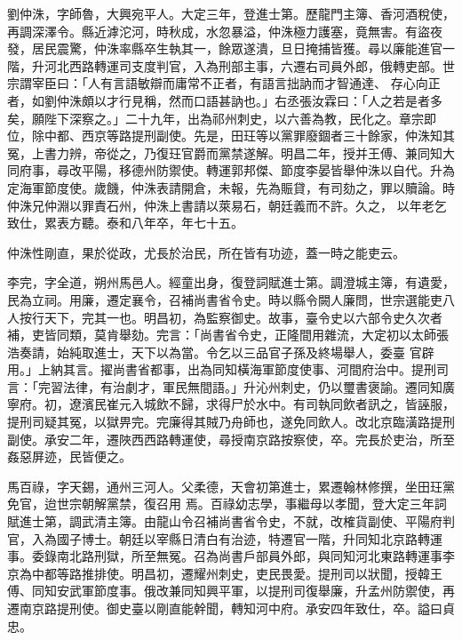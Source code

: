 \begin{pinyinscope}
 劉仲洙，字師魯，大興宛平人。大定三年，登進士第。歷龍門主簿、香河酒稅使，再調深澤令。縣近滹沱河，時秋成，水忽暴溢，仲洙極力護塞，竟無害。有盜夜發，居民震驚，仲洙率縣卒生執其一，餘眾遂潰，旦日掩捕皆獲。尋以廉能進官一階，升河北西路轉運司支度判官，入為刑部主事，六遷右司員外郎，俄轉吏部。世宗謂宰臣曰：「人有言語敏辯而庸常不正者，有語言拙訥而才智通達、
 存心向正者，如劉仲洙頗以才行見稱，然而口語甚訥也。」右丞張汝霖曰：「人之若是者多矣，願陛下深察之。」二十九年，出為祁州刺史，以六善為教，民化之。章宗即位，除中都、西京等路提刑副使。先是，田玨等以黨罪廢錮者三十餘家，仲洙知其冤，上書力辨，帝從之，乃復玨官爵而黨禁遂解。明昌二年，授并王傅、兼同知大同府事，尋改平陽，移德州防禦使。轉運郭邦傑、節度李晏皆舉仲洙以自代。升為定海軍節度使。歲饑，仲洙表請開倉，未報，先為賑貸，有司劾之，罪以贖論。時仲洙兄仲淵以罪責石州，仲洙上書請以萊易石，朝廷義而不許。久之，
 以年老乞致仕，累表方聽。泰和八年卒，年七十五。



 仲洙性剛直，果於從政，尤長於治民，所在皆有功迹，蓋一時之能吏云。



 李完，字全道，朔州馬邑人。經童出身，復登詞賦進士第。調澄城主簿，有遺愛，民為立祠。用廉，遷定襄令，召補尚書省令史。時以縣令闕人廉問，世宗選能吏八人按行天下，完其一也。明昌初，為監察御史。故事，臺令史以六部令史久次者補，吏皆同類，莫肯舉劾。完言：「尚書省令史，正隆間用雜流，大定初以太師張浩奏請，始純取進士，天下以為當。令乞以三品官子孫及終場舉人，委臺
 官辟用。」上納其言。擢尚書省都事，出為同知橫海軍節度使事、河間府治中。提刑司言：「完習法律，有治劇才，軍民無間語。」升沁州刺史，仍以璽書褒諭。遷同知廣寧府。初，遼濱民崔元入城飲不歸，求得尸於水中。有司執同飲者訊之，皆誣服，提刑司疑其冤，以獄畀完。完廉得其賊乃舟師也，遂免同飲人。改北京臨潢路提刑副使。承安二年，遷陜西西路轉運使，尋授南京路按察使，卒。完長於吏治，所至姦惡屏迹，民皆便之。



 馬百祿，字天錫，通州三河人。父柔德，天會初第進士，累遷翰林修撰，坐田玨黨免官，迨世宗朝解黨禁，復召用
 焉。百祿幼志學，事繼母以孝聞，登大定三年詞賦進士第，調武清主簿。由龍山令召補尚書省令史，不就，改榷貨副使、平陽府判官，入為國子博士。朝廷以宰縣日清白有治迹，特遷官一階，升同知北京路轉運事。委錄南北路刑獄，所至無冤。召為尚書戶部員外郎，與同知河北東路轉運事李京為中都等路推排使。明昌初，遷耀州刺史，吏民畏愛。提刑司以狀聞，授韓王傅、同知安武軍節度事。俄改兼同知興平軍，以提刑司復舉廉，升孟州防禦使，再遷南京路提刑使。御史臺以剛直能幹聞，轉知河中府。承安四年致仕，卒。謚曰貞忠。




\end{pinyinscope}
